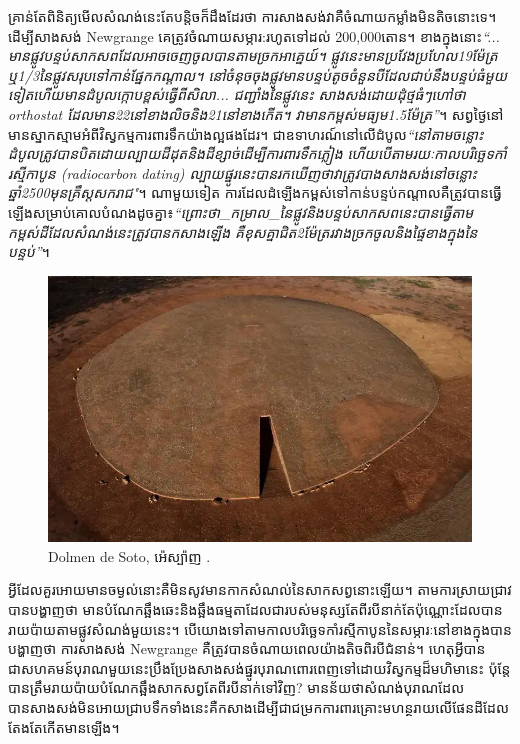 \documentclass[10pt,twocolumn,letterpaper]{article}
\begin{document}
គ្រាន់តែពិនិត្យមើលសំណង់នេះតែបន្តិចក៏ដឹងដែរថា ការសាងសង់វាគឺចំណាយកម្លាំងមិនតិចនោះទេ។ ដើម្បីសាងសង់ Newgrange គេត្រូវចំណាយសម្ភារ:រហូតទៅដល់ 200,000តោន។ ខាងក្នុងនោះ\textit{“... មានផ្លូវបន្ទប់សាកសពដែលអាចចេញចូលបានតាមច្រកអាគ្នេយ៍។ ផ្លូវនេះមានប្រវែងប្រហែល19ម៉ែត្រ ឬ1/3នៃផ្លូវសរុបទៅកាន់ផ្នែកកណ្ដាល។ នៅចំនុចចុងផ្លូវមានបន្ទប់តូចចំនួនបីដែលជាប់នឹងបន្ទប់ធំមួយទៀតហើយមានដំបូលក្កោបខ្ពស់ធ្វើពីសិលា... ជញ្ជាំងនៃផ្លូវនេះ សាងសង់ដោយដុំថ្មធំៗហៅថា orthostat ដែលមាន22នៅខាងលិចនិង21នៅខាងកើត។ វាមានកម្ពស់មធ្យម1.5ម៉ែត្រ”}\cite{70}។ សព្វថ្ងៃនៅមានស្នាកស្មាមអំពីវិស្វកម្មការពារទឹកយ៉ាងល្អផងដែរ។ ជាឧទាហរណ៍នៅលើដំបូល\textit{“នៅតាមចន្លោះដំបូលត្រូវបានបិតដោយល្បាយដីដុតនិងដីខ្សាច់ដើម្បីការពារទឹកភ្លៀង ហើយបើតាមរយៈកាលបរិច្ឆេទកាំរស្មីកាបូន (radiocarbon dating) ល្បាយផ្នូរនេះបានរកឃើញថាវាត្រូវបាងសាងសង់នៅចន្លោះឆ្នាំ2500មុនគ្រឹស្តសករាជ"}\cite{71}។ ណាមួយទៀត ការដែលដំឡើងកម្ពស់ទៅកាន់បន្ទប់កណ្តាលគឺត្រូវបានធ្វើឡើងសម្រាប់គោលបំណងដូចគ្នា៖\textit{“ព្រោះថា\_កម្រាល\_នៃផ្លូវនិងបន្ទប់សាកសពនេះបានធ្វើតាមកម្ពស់ដីដែលសំណង់នេះត្រូវបានកសាងឡើង គឺខុសគ្នាជិត2ម៉ែត្ររវាងច្រកចូលនិងផ្ទៃខាងក្នុងនៃបន្ទប់”}\cite{71}។

\begin{figure}[b]
\begin{center}
   \includegraphics[width=1\linewidth]{dolmen.jpg}
\end{center}
   \caption{Dolmen de Soto, អ៉េស្ប៉ាញ \cite{53}.}
\label{fig:9}
\label{fig:onecol}
\end{figure}

អ្វីដែលគួរអោយមានចម្ងល់នោះគឺមិនសូវមានកាកសំណល់នៃសាកសព្វនោះឡើយ។ តាមការស្រាយជ្រាវបានបង្ហាញថា មានបំណែកឆ្អឹងឆេះនិងឆ្អឹងធម្មតាដែលជារបស់មនុស្សតែពីរបីនាក់តែប៉ុណ្ណោះដែលបានរាយប៉ាយតាមផ្លូវសំណង់មួយនេះ។ បើយោងទៅតាមកាលបរិច្ឆេទកាំរស្មីកាបូននៃសម្ភារៈនៅខាងក្នុងបានបង្ហាញថា ការសាងសង់ Newgrange គឺត្រូវបានចំណាយពេលយ៉ាងតិចពិរបីជំនាន់។ ហេតុអ្វីបានជាសហគមន៍បុរាណមួយនេះប្រឹងប្រែងសាងសង់ផ្នូរបុរាណពោរពេញទៅដោយវិស្វកម្មដ៏មហិមានេះ ប៉ុន្តែបានត្រឹមរាយប៉ាយបំណែកឆ្អឹងសាកសព្វតែពីរបីនាក់ទៅវិញ? មានន័យថាសំណង់បុរាណដែលបានសាងសង់មិនអោយជ្រាបទឹកទាំងនេះគឺកសាងដើម្បីជាជម្រកការពារគ្រោះមហន្ថរាយលើផែនដីដែលតែងតែកើតមានឡើង។
\end{document}
